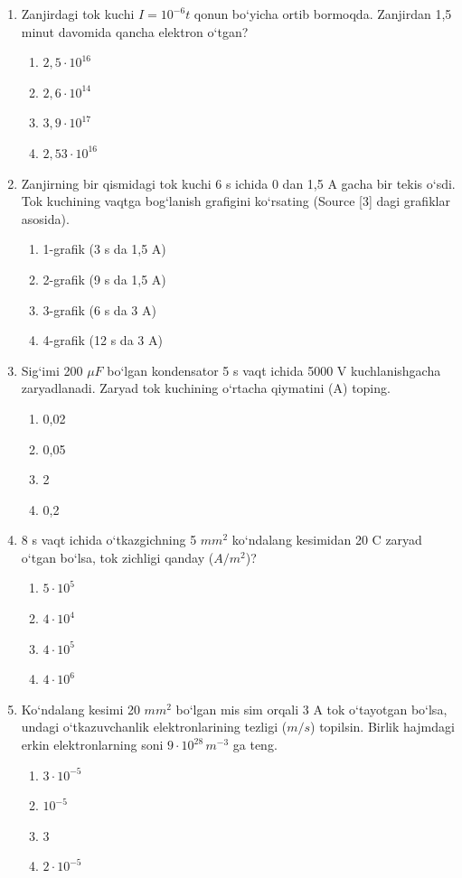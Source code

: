 \begin{enumerate}
\item Zanjirdagi tok kuchi $I = 10^{-6}t$ qonun bo‘yicha ortib bormoqda. Zanjirdan 1,5 minut davomida qancha elektron o‘tgan?
\begin{enumerate}[label=\Alph*)]
\item $2,5 \cdot 10^{16}$
\item $2,6 \cdot 10^{14}$
\item $3,9 \cdot 10^{17}$
\item $2,53 \cdot 10^{16}$
\end{enumerate}

\item Zanjirning bir qismidagi tok kuchi 6 s ichida 0 dan 1,5 A gacha bir tekis o‘sdi. Tok kuchining vaqtga bog‘lanish grafigini ko‘rsating (Source [3] dagi grafiklar asosida).
\begin{enumerate}[label=\Alph*)]
\item 1-grafik (3 s da 1,5 A)
\item 2-grafik (9 s da 1,5 A)
\item 3-grafik (6 s da 3 A)
\item 4-grafik (12 s da 3 A)
\end{enumerate}

\item Sig‘imi 200 $\mu F$ bo‘lgan kondensator 5 s vaqt ichida 5000 V kuchlanishgacha zaryadlanadi. Zaryad tok kuchining o‘rtacha qiymatini (A) toping.
\begin{enumerate}[label=\Alph*)]
\item 0,02
\item 0,05
\item 2
\item 0,2
\end{enumerate}

\item 8 s vaqt ichida o‘tkazgichning 5 $mm^2$ ko‘ndalang kesimidan 20 C zaryad o‘tgan bo‘lsa, tok zichligi qanday ($A/m^2$)?
\begin{enumerate}[label=\Alph*)]
\item $5 \cdot 10^5$
\item $4 \cdot 10^4$
\item $4 \cdot 10^5$
\item $4 \cdot 10^6$
\end{enumerate}

\item Ko‘ndalang kesimi 20 $mm^2$ bo‘lgan mis sim orqali 3 A tok o‘tayotgan bo‘lsa, undagi o‘tkazuvchanlik elektronlarining tezligi ($m/s$) topilsin. Birlik hajmdagi erkin elektronlarning soni $9 \cdot 10^{28} \, m^{-3}$ ga teng.
\begin{enumerate}[label=\Alph*)]
\item $3 \cdot 10^{-5}$
\item $10^{-5}$
\item 3
\item $2 \cdot 10^{-5}$
\end{enumerate}


\end{enumerate}
